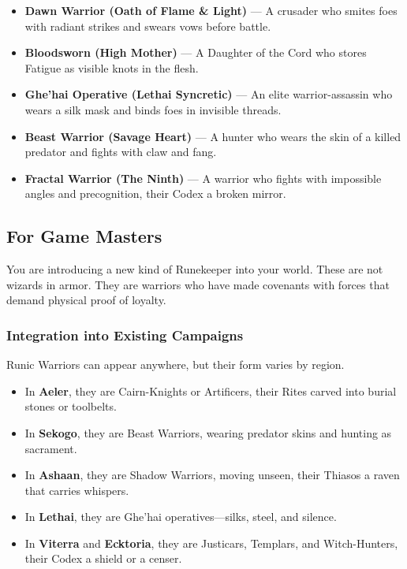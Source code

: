 \begin{itemize}
\item \textbf{Dawn Warrior (Oath of Flame \& Light)} — A crusader who smites foes with radiant strikes and swears vows before battle.
\item \textbf{Bloodsworn (High Mother)} — A Daughter of the Cord who stores Fatigue as visible knots in the flesh.
\item \textbf{Ghe'hai Operative (Lethai Syncretic)} — An elite warrior-assassin who wears a silk mask and binds foes in invisible threads.
\item \textbf{Beast Warrior (Savage Heart)} — A hunter who wears the skin of a killed predator and fights with claw and fang.
\item \textbf{Fractal Warrior (The Ninth)} — A warrior who fights with impossible angles and precognition, their Codex a broken mirror.
\end{itemize}

\subsection{For Game Masters}

You are introducing a new kind of Runekeeper into your world. These are not wizards in armor. They are warriors who have made covenants with forces that demand physical proof of loyalty.

\subsubsection{Integration into Existing Campaigns}

Runic Warriors can appear anywhere, but their form varies by region.

\begin{itemize}
\item In \textbf{Aeler}, they are Cairn-Knights or Artificers, their Rites carved into burial stones or toolbelts.
\item In \textbf{Sekogo}, they are Beast Warriors, wearing predator skins and hunting as sacrament.
\item In \textbf{Ashaan}, they are Shadow Warriors, moving unseen, their Thiasos a raven that carries whispers.
\item In \textbf{Lethai}, they are Ghe'hai operatives—silks, steel, and silence.
\item In \textbf{Viterra} and \textbf{Ecktoria}, they are Justicars, Templars, and Witch-Hunters, their Codex a shield or a censer.
\end{itemize}

